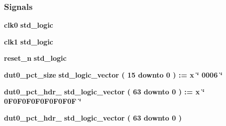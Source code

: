 \subsubsection*{Signals}
 \begin{DoxyCompactItemize}
\item 
{\bf clk0} {\bfseries \textcolor{comment}{std\+\_\+logic}\textcolor{vhdlchar}{ }} 
\item 
{\bf clk1} {\bfseries \textcolor{comment}{std\+\_\+logic}\textcolor{vhdlchar}{ }} 
\item 
{\bf reset\+\_\+n} {\bfseries \textcolor{comment}{std\+\_\+logic}\textcolor{vhdlchar}{ }} 
\item 
{\bf dut0\+\_\+pct\+\_\+size} {\bfseries \textcolor{comment}{std\+\_\+logic\+\_\+vector}\textcolor{vhdlchar}{ }\textcolor{vhdlchar}{(}\textcolor{vhdlchar}{ }\textcolor{vhdlchar}{ } \textcolor{vhdldigit}{15} \textcolor{vhdlchar}{ }\textcolor{keywordflow}{downto}\textcolor{vhdlchar}{ }\textcolor{vhdlchar}{ } \textcolor{vhdldigit}{0} \textcolor{vhdlchar}{ }\textcolor{vhdlchar}{)}\textcolor{vhdlchar}{ }\textcolor{vhdlchar}{ }\textcolor{vhdlchar}{ }\textcolor{vhdlchar}{\+:}\textcolor{vhdlchar}{=}\textcolor{vhdlchar}{ }\textcolor{vhdlchar}{ }\textcolor{vhdlchar}{x}\textcolor{vhdlchar}{ }\textcolor{keyword}{\char`\"{} 0006 \char`\"{}}\textcolor{vhdlchar}{ }} 
\item 
{\bf dut0\+\_\+pct\+\_\+hdr\+\_} {\bfseries \textcolor{comment}{std\+\_\+logic\+\_\+vector}\textcolor{vhdlchar}{ }\textcolor{vhdlchar}{(}\textcolor{vhdlchar}{ }\textcolor{vhdlchar}{ } \textcolor{vhdldigit}{63} \textcolor{vhdlchar}{ }\textcolor{keywordflow}{downto}\textcolor{vhdlchar}{ }\textcolor{vhdlchar}{ } \textcolor{vhdldigit}{0} \textcolor{vhdlchar}{ }\textcolor{vhdlchar}{)}\textcolor{vhdlchar}{ }\textcolor{vhdlchar}{ }\textcolor{vhdlchar}{ }\textcolor{vhdlchar}{\+:}\textcolor{vhdlchar}{=}\textcolor{vhdlchar}{ }\textcolor{vhdlchar}{ }\textcolor{vhdlchar}{x}\textcolor{vhdlchar}{ }\textcolor{keyword}{\char`\"{} 0\+F0\+F0\+F0\+F0\+F0\+F0\+F0\+F \char`\"{}}\textcolor{vhdlchar}{ }} 
\item 
{\bf dut0\+\_\+pct\+\_\+hdr\+\_} {\bfseries \textcolor{comment}{std\+\_\+logic\+\_\+vector}\textcolor{vhdlchar}{ }\textcolor{vhdlchar}{(}\textcolor{vhdlchar}{ }\textcolor{vhdlchar}{ } \textcolor{vhdldigit}{63} \textcolor{vhdlchar}{ }\textcolor{keywordflow}{downto}\textcolor{vhdlchar}{ }\textcolor{vhdlchar}{ } \textcolor{vhdldigit}{0} \textcolor{vhdlchar}{ }\textcolor{vhdlchar}{)}\textcolor{vhdlchar}{ }} 
\item 

\end{DoxyCompactItemize}
